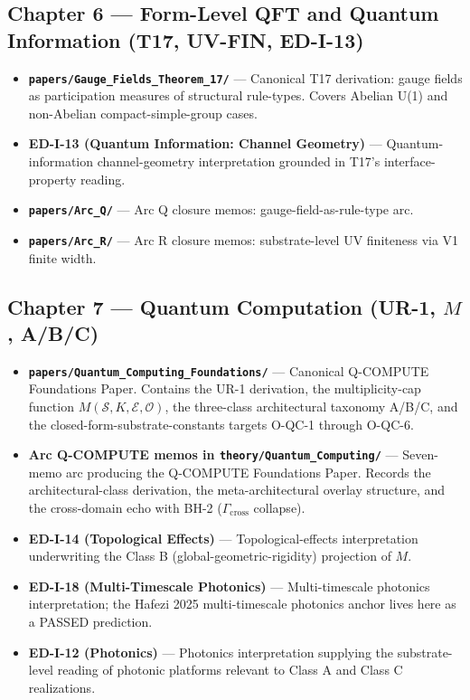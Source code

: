 \documentclass[11pt]{book}
\begin{document}
\subsection{Chapter 6 — Form-Level QFT and Quantum Information (T17, UV-FIN, ED-I-13)}

\begin{itemize}
\item \textbf{\texttt{papers/Gauge\_Fields\_Theorem\_17/}} — Canonical T17 derivation: gauge fields as participation measures of structural rule-types. Covers Abelian U(1) and non-Abelian compact-simple-group cases.
\item \textbf{ED-I-13 (Quantum Information: Channel Geometry)} — Quantum-information channel-geometry interpretation grounded in T17's interface-property reading.
\item \textbf{\texttt{papers/Arc\_Q/}} — Arc Q closure memos: gauge-field-as-rule-type arc.
\item \textbf{\texttt{papers/Arc\_R/}} — Arc R closure memos: substrate-level UV finiteness via V1 finite width.
\end{itemize}

\subsection{Chapter 7 — Quantum Computation (UR-1, $M$, A/B/C)}

\begin{itemize}
\item \textbf{\texttt{papers/Quantum\_Computing\_Foundations/}} — Canonical Q-COMPUTE Foundations Paper. Contains the UR-1 derivation, the multiplicity-cap function $M(\mathcal{S}, K, \mathcal{E}, \mathcal{O})$, the three-class architectural taxonomy A/B/C, and the closed-form-substrate-constants targets O-QC-1 through O-QC-6.
\item \textbf{Arc Q-COMPUTE memos in \texttt{theory/Quantum\_Computing/}} — Seven-memo arc producing the Q-COMPUTE Foundations Paper. Records the architectural-class derivation, the meta-architectural overlay structure, and the cross-domain echo with BH-2 ($\Gamma_\mathrm{cross}$ collapse).
\item \textbf{ED-I-14 (Topological Effects)} — Topological-effects interpretation underwriting the Class B (global-geometric-rigidity) projection of $M$.
\item \textbf{ED-I-18 (Multi-Timescale Photonics)} — Multi-timescale photonics interpretation; the Hafezi 2025 multi-timescale photonics anchor lives here as a PASSED prediction.
\item \textbf{ED-I-12 (Photonics)} — Photonics interpretation supplying the substrate-level reading of photonic platforms relevant to Class A and Class C realizations.
\end{itemize}
\end{document}
